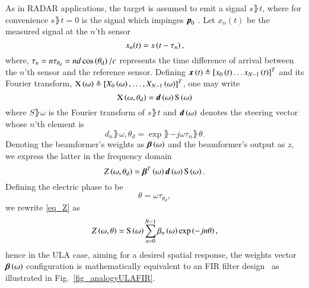 \par As in RADAR applications, the target is assumed to emit a signal $s\rBrace{t}$, where for convenience $s\rBrace{t=0}$ is the signal which impinges $\boldsymbol{p}_{0}$ .
Let $x_{n}(t)$ be the measured signal at the $n$'th sensor
\begin{equation}
x_{n}(t) = s\left({t-\tau_{n}}\right),
\label{eqn:noFeedbackULA_singleSensor_temporal}
\end{equation}
where, $\tau_{n}=n\tau_{\theta_{d}}=nd\cos\left({\theta_{\text{d}}}\right)/c$ represents the time difference of arrival between the $n$'th sensor and the reference sensor.
Defining $\boldsymbol{x}\left({t}\right)\triangleq\left[{x_{0}\left({t}\right)\hdots{}x_{N-1}\left({t}\right)}\right]^{T}$ and its Fourier transform, $\vecnot{\F{x}}\rBrace{\omega}\triangleq\vBrace{X_{0}\rBrace{\omega},\hdots,X_{N-1}\rBrace{\omega}}^{T}$, one may write 
\[
\vecnot{\F{x}}\rBrace{\omega,\theta_{d}}=\vecnot{d}\rBrace{\omega}\F{s}\rBrace{\omega}
\]
where $S\rBrace{\omega}$ is the Fourier transform of $s\rBrace{t}$ and $\boldsymbol{d}\left({\omega}\right)$ denotes the steering vector whose $n$'th element is
\begin{equation}
    \label{eq:d}
    d_{n}\rBrace{\omega,\theta_{d}} = \exp{\rBrace{-j\omega\tau_{n}\rBrace{\theta}}}.
\end{equation}
Denoting the beamformer's weights as $\boldsymbol{\beta}\left({\omega}\right)$ and the beamformer's output as $z$, we express the latter in the frequency domain
\begin{equation}
    \label{eq_Z}
    Z\rBrace{\omega,\theta_{d}} = \vecnot{\beta}^{T}\rBrace{\omega}\vecnot{d}\rBrace{\omega}\F{s}\rBrace{\omega}.
\end{equation}
Defining the electric phase to be
\begin{equation}\label{eq:thetaULA}
\theta=\omega\tau_{\theta_{d}},
\end{equation}
we rewrite \eqref{eq_Z} as 
\[
Z\rBrace{\omega,\theta} = \F{s}\rBrace{\omega}\sum_{n=0}^{N-1}\beta_{n}\rBrace{\omega}\exp\Brack{-jn\theta},
\]
hence in the ULA case, aiming for a desired spatial response, the weights vector $\boldsymbol{\beta}\left({\omega}\right)$ configuration is mathematically equivalent to an FIR filter design~\cite{van1988beamforming,benesty2018} as illustrated in Fig.~\ref{fig_analogyULAFIR}.

